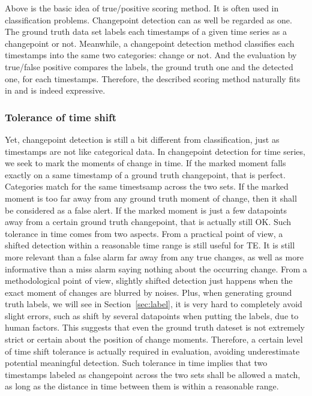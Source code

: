 Above is the basic idea of true/positive scoring method.
It is often used in classification problems.
Changepoint detection can as well be regarded as one.
The ground truth data set labels each timestamps of a given time series as a changepoint or not.
Meanwhile, a changepoint detection method classifies each timestamps into the same two categories: change or not.
And the evaluation by true/false positive compares the labels, the ground truth one and the detected one, for each timestamps. 
Therefore, the described scoring method naturally fits in and is indeed expressive.

\subsubsection{Tolerance of time shift}
Yet, changepoint detection is still a bit different from classification, just as timestamps are not like categorical data.
In changepoint detection for time series, we seek to mark the moments of change in time. 
If the marked moment falls exactly on a same timestamp of a ground truth changepoint, that is perfect. Categories match for the same timestsamp across the two sets.
If the marked moment is too far away from any ground truth moment of change, then it shall be considered as a false alert.
If the marked moment is just a few datapoints away from a certain ground truth changepoint, that is actually still OK.
Such tolerance in time comes from two aspects.
From a practical point of view, a shifted detection within a reasonable time range is still useful for TE.
It is still more relevant than a false alarm far away from any true changes, as well as more informative than a miss alarm saying nothing about the occurring change.
From a methodological point of view, slightly shifted detection just happens when  the exact moment of changes are blurred by noises.
Plus, when generating ground truth labels, we will see in Section~\ref{sec:label}, it is very hard to completely avoid slight errors, such as shift by several datapoints when putting the labels, due to human factors.
This suggests that even the ground truth dateset is not extremely strict or certain about the position of change moments.
Therefore, a certain level of time shift tolerance is actually required in evaluation, avoiding underestimate potential meaningful detection.
Such tolerance in time implies that two timestamps labeled as changepoint across the two sets shall be allowed a match, as long as the distance in time between them is within a reasonable range.

